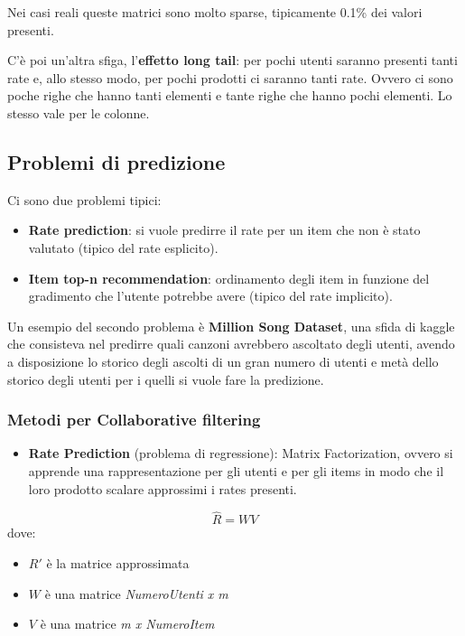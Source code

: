 Nei casi reali queste matrici sono molto sparse, tipicamente 0.1\% dei
valori presenti.

C'è poi un'altra sfiga, l'\textbf{effetto long tail}: per pochi utenti
saranno presenti tanti rate e, allo stesso modo, per pochi prodotti ci saranno tanti rate.
Ovvero ci sono poche righe che hanno tanti elementi e tante righe che
hanno pochi elementi. Lo stesso vale per le colonne.

\subsection{Problemi di predizione}\label{problemi-di-predizione}

Ci sono due problemi tipici:

\begin{itemize}
\tightlist
\item
  \textbf{Rate prediction}: si vuole predirre il rate per un item che
  non è stato valutato (tipico del rate esplicito).
\item
  \textbf{Item top-n recommendation}: ordinamento degli item in funzione
  del gradimento che l'utente potrebbe avere (tipico del rate implicito).
\end{itemize}

Un esempio del secondo problema è \textbf{Million Song Dataset}, una
sfida di kaggle che consisteva nel predirre quali canzoni avrebbero
ascoltato degli utenti, avendo a disposizione lo storico degli ascolti
di un gran numero di utenti e metà dello storico degli utenti per i
quelli si vuole fare la predizione.

\subsubsection{Metodi per Collaborative
filtering}\label{metodi-per-collaborative-filtering}

\begin{itemize}
\item
  \textbf{Rate Prediction} (problema di regressione): Matrix
  Factorization, ovvero si apprende una rappresentazione per gli utenti
  e per gli items in modo che il loro prodotto scalare approssimi i
  rates presenti.
\end{itemize}

$$
\hat{R} = W V
$$
dove:
\begin{itemize}
\item
  $R'$ è la matrice approssimata
\item
  $W$ è una matrice \textit{NumeroUtenti x m}
\item
  $V$ è una matrice \textit{m x NumeroItem}
\end{itemize}


